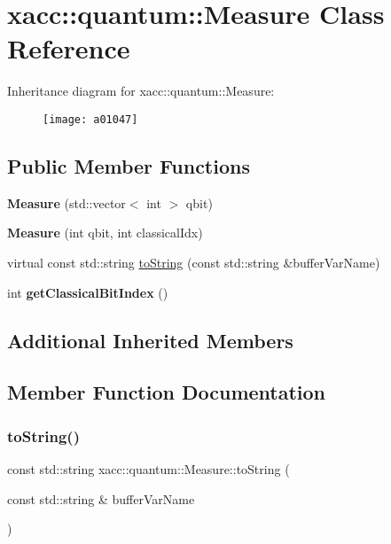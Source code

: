 \hypertarget{a01047}{}\section{xacc\+:\+:quantum\+:\+:Measure Class Reference}
\label{a01047}
Inheritance diagram for xacc\+:\+:quantum\+:\+:Measure\+:\begin{figure}[H]
\begin{center}
\leavevmode
\texttt{[image: a01047]}
\end{center}
\end{figure}
\subsection*{Public Member Functions}
\begin{DoxyCompactItemize}
\item 
\mbox{\label{a01047_afe330a0eea029d842ff9c88a817dcc7d}} 
{\bfseries Measure} (std\+::vector$<$ int $>$ qbit)
\item 
\mbox{\label{a01047_a9b8d9edca8ad2c3fb132780200f17335}} 
{\bfseries Measure} (int qbit, int classical\+Idx)
\item 
virtual const std\+::string \hyperlink{a01047_a1c51a5d68294dcb2ba1a9fbea63a730f}{to\+String} (const std\+::string \&buffer\+Var\+Name)
\item 
\mbox{\label{a01047_a0cb3c94731544042807236ade36fddd0}} 
int {\bfseries get\+Classical\+Bit\+Index} ()
\end{DoxyCompactItemize}
\subsection*{Additional Inherited Members}


\subsection{Member Function Documentation}
\mbox{\label{a01047_a1c51a5d68294dcb2ba1a9fbea63a730f}} 
\subsubsection{\texorpdfstring{to\+String()}{toString()}}
{\footnotesize\ttfamily const std\+::string xacc\+::quantum\+::\+Measure\+::to\+String (\begin{DoxyParamCaption}\item[{const std\+::string \&}]{buffer\+Var\+Name }\end{DoxyParamCaption})\hspace{0.3cm}{\ttfamily [virtual]}}

